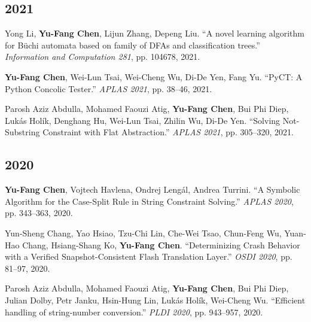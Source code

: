 \documentclass[10.5pt,a4paper]{article}
\begin{document}
\subsection*{2021}
\begin{enumerate}[leftmargin=*,label={[\arabic*]},resume]
\item Yong Li, \textbf{Yu-Fang Chen}, Lijun Zhang, Depeng Liu. ``A novel learning algorithm for Büchi automata based on family of DFAs and classification trees.'' \emph{Information and Computation 281}, pp. 104678, 2021.
\item \textbf{Yu-Fang Chen}, Wei-Lun Tsai, Wei-Cheng Wu, Di-De Yen, Fang Yu. ``PyCT: A Python Concolic Tester.'' \emph{APLAS 2021}, pp. 38--46, 2021.
\item Parosh Aziz Abdulla, Mohamed Faouzi Atig, \textbf{Yu-Fang Chen}, Bui Phi Diep, Lukás Holík, Denghang Hu, Wei-Lun Tsai, Zhilin Wu, Di-De Yen. ``Solving Not-Substring Constraint with Flat Abstraction.'' \emph{APLAS 2021}, pp. 305--320, 2021.
\end{enumerate}
\subsection*{2020}
\begin{enumerate}[leftmargin=*,label={[\arabic*]},resume]
\item \textbf{Yu-Fang Chen}, Vojtech Havlena, Ondrej Lengál, Andrea Turrini. ``A Symbolic Algorithm for the Case-Split Rule in String Constraint Solving.'' \emph{APLAS 2020}, pp. 343--363, 2020.
\item Yun-Sheng Chang, Yao Hsiao, Tzu-Chi Lin, Che-Wei Tsao, Chun-Feng Wu, Yuan-Hao Chang, Hsiang-Shang Ko, \textbf{Yu-Fang Chen}. ``Determinizing Crash Behavior with a Verified Snapshot-Consistent Flash Translation Layer.'' \emph{OSDI 2020}, pp. 81--97, 2020.
\item Parosh Aziz Abdulla, Mohamed Faouzi Atig, \textbf{Yu-Fang Chen}, Bui Phi Diep, Julian Dolby, Petr Janku, Hsin-Hung Lin, Lukás Holík, Wei-Cheng Wu. ``Efficient handling of string-number conversion.'' \emph{PLDI 2020}, pp. 943--957, 2020.
\end{enumerate}
\end{document}
